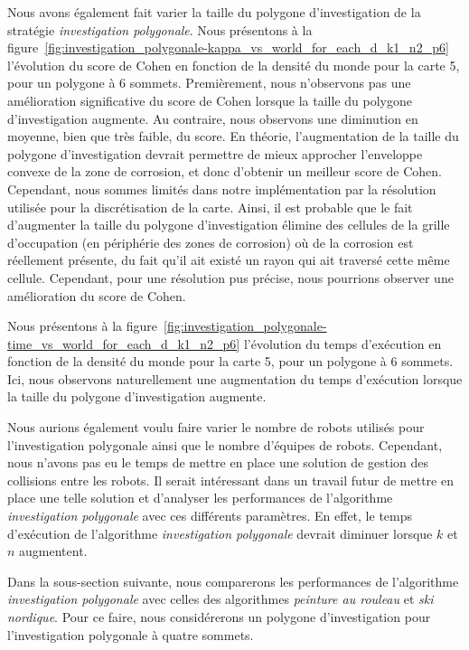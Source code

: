 \documentclass[francais,RandD]{rapportPFE}
\begin{document}
			Nous avons également fait varier la taille du polygone d'investigation de la stratégie \textit{investigation polygonale}.
			Nous présentons à la figure~\ref{fig:investigation_polygonale-kappa_vs_world_for_each_d_k1_n2_p6} l'évolution du score de Cohen en fonction de la densité du monde pour la carte 5, pour un polygone à 6 sommets.
			Premièrement, nous n'observons pas une amélioration significative du score de Cohen lorsque la taille du polygone d'investigation augmente.
			Au contraire, nous observons une diminution en moyenne, bien que très faible, du score.
			En théorie, l'augmentation de la taille du polygone d'investigation devrait permettre de mieux approcher l'enveloppe convexe de la zone de corrosion, et donc d'obtenir un meilleur score de Cohen.
			Cependant, nous sommes limités dans notre implémentation par la résolution utilisée pour la discrétisation de la carte.
			Ainsi, il est probable que le fait d'augmenter la taille du polygone d'investigation élimine des cellules de la grille d'occupation (en périphérie des zones de corrosion) où de la corrosion est réellement présente, du fait qu'il ait existé un rayon qui ait traversé cette même cellule.
			Cependant, pour une résolution pus précise, nous pourrions observer une amélioration du score de Cohen.

			Nous présentons à la figure~\ref{fig:investigation_polygonale-time_vs_world_for_each_d_k1_n2_p6} l'évolution du temps d'exécution en fonction de la densité du monde pour la carte 5, pour un polygone à 6 sommets.
			Ici, nous observons naturellement une augmentation du temps d'exécution lorsque la taille du polygone d'investigation augmente.

			Nous aurions également voulu faire varier le nombre de robots utilisés pour l'investigation polygonale ainsi que le nombre d'équipes de robots.
			Cependant, nous n'avons pas eu le temps de mettre en place une solution de gestion des collisions entre les robots.
			Il serait intéressant dans un travail futur de mettre en place une telle solution et d'analyser les performances de l'algorithme \textit{investigation polygonale} avec ces différents paramètres.
			En effet, le temps d'exécution de l'algorithme \textit{investigation polygonale} devrait diminuer lorsque $k$ et $n$ augmentent.

			Dans la sous-section suivante, nous comparerons les performances de l'algorithme \textit{investigation polygonale} avec celles des algorithmes \textit{peinture au rouleau} et \textit{ski nordique}.
			Pour ce faire, nous considérerons un polygone d'investigation pour l'investigation polygonale à quatre sommets.
\end{document}
